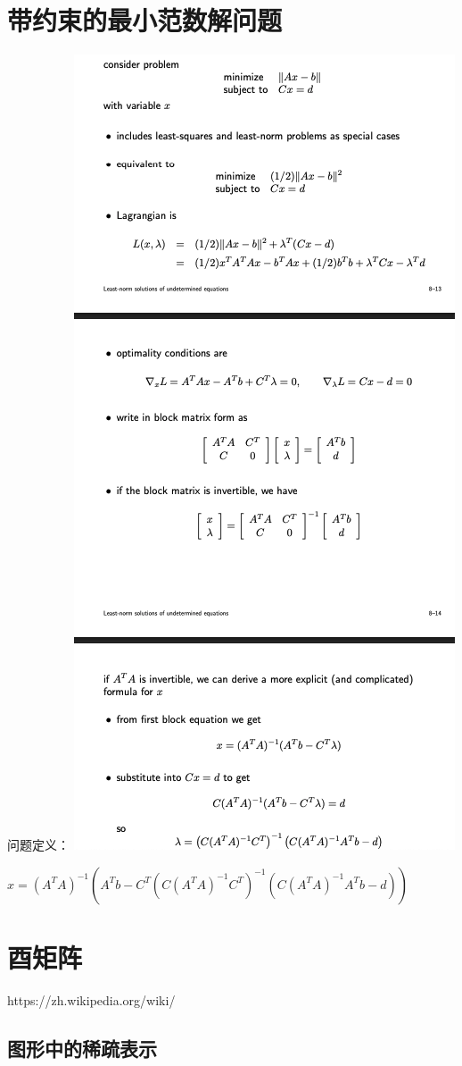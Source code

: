 \section{带约束的最小范数解问题}
问题定义：
\includegraphics{MathTools/assets/rinv_with_constraints.png}
\begin{theorembox}
	$x = (A^TA)^{-1}(A^Tb-C^T(C(A^TA)^{-1}C^T)^{-1}(C(A^TA)^{-1}A^Tb-d))$
\end{theorembox}
\section{酉矩阵}
https://zh.wikipedia.org/wiki/%
\subsection{图形中的稀疏表示}

